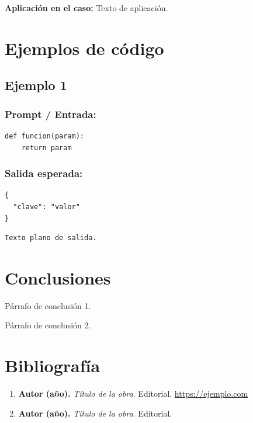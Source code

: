 \documentclass[11pt,a4paper]{article}
\begin{document}
\textbf{Aplicación en el caso:} Texto de aplicación.

\newpage
\section{Ejemplos de código}

\subsection{Ejemplo 1}

\subsubsection*{Prompt / Entrada:}
\begin{verbatim}
def funcion(param):
    return param
\end{verbatim}

\subsubsection*{Salida esperada:}
\begin{verbatim}
{
  "clave": "valor"
}
\end{verbatim}

\begin{verbatim}
Texto plano de salida.
\end{verbatim}

\newpage
\section*{Conclusiones}
Párrafo de conclusión 1.

Párrafo de conclusión 2.

\newpage
\section{Bibliografía}
\begin{enumerate}
\item \textbf{Autor (año).} \textit{Título de la obra}. Editorial. \url{https://ejemplo.com}
\item \textbf{Autor (año).} \textit{Título de la obra}. Editorial.
\end{enumerate}
\end{document}
